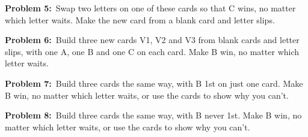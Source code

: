 \documentclass[12pt]{article}
\newcommand{\prob}[1]{\textbf{Problem #1:}~}
\newcommand{\card}[7]{%
  \begin{scope}[shift={(#1,#2)},scale=#3,transform shape]
    \begin{scope}
      \clip[rounded corners=1.5mm] (0,0) rectangle (45,-80);
      \fill[black!13] (0,0) rectangle (45,-11);
    \end{scope}
    \draw[line width=0.9pt,rounded corners=1.5mm] (0,0) rectangle (45,-80);
    \draw[line width=0.5pt] (0,-11)--(45,-11) (0,-34)--(45,-34) (0,-57)--(45,-57);
    \node at (22.5,-5.5) {\fontsize{16}{16}\selectfont\bfseries #4};
    \ifdim #3pt<0.55pt\else %
    \node[anchor=north west,inner sep=0pt] at (2,-13) {\fontsize{7}{7}\selectfont 1st};
    \node[anchor=north west,inner sep=0pt] at (2,-36) {\fontsize{7}{7}\selectfont 2nd};
    \node[anchor=north west,inner sep=0pt] at (2,-59) {\fontsize{7}{7}\selectfont 3rd};
    \fi
    \node at (22.5,-22.5) {\fontsize{54}{54}\selectfont\bfseries #5};
    \node at (22.5,-45.5) {\fontsize{54}{54}\selectfont\bfseries #6};
    \node at (22.5,-68.5) {\fontsize{54}{54}\selectfont\bfseries #7};
  \end{scope}}
\newcommand{\frames}[2]{%
  \card{#1}{#2}{0.5}{V1}{}{}{}
  \card{#1+30}{#2}{0.5}{V2}{}{}{}
  \card{#1+60}{#2}{0.5}{V3}{}{}{}}
\begin{document}
\newpage
\prob{5}Swap two letters on one of these cards so that C wins, no matter which
letter waits. Make the new card from a blank card and letter slips.

\vspace{6mm}
\begin{center}
\end{center}

\vspace{22mm}
\prob{6}Build three new cards V1, V2 and V3 from blank cards and letter slips,
with one A, one B and one C on each card. Make B win, no matter which letter waits.

\vspace{8mm}
\begin{center}
\end{center}

\newpage
\prob{7}Build three cards the same way, with B 1st on just one card. Make B win,
no matter which letter waits, or use the cards to show why you can't.

\vspace{8mm}
\begin{center}
\end{center}

\vspace{22mm}
\prob{8}Build three cards the same way, with B never 1st. Make B win, no matter
which letter waits, or use the cards to show why you can't.

\vspace{8mm}
\begin{center}
\end{center}
\end{document}
